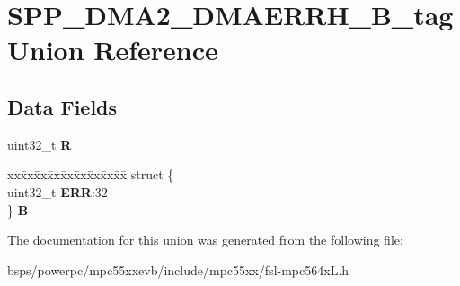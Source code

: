 \hypertarget{unionSPP__DMA2__DMAERRH__32B__tag}{}\section{S\+P\+P\+\_\+\+D\+M\+A2\+\_\+\+D\+M\+A\+E\+R\+R\+H\+\_\+B\+\_\+tag Union Reference}
\label{unionSPP__DMA2__DMAERRH__32B__tag}
\subsection*{Data Fields}
\begin{DoxyCompactItemize}
\item 
\mbox{\label{unionSPP__DMA2__DMAERRH__32B__tag_a173883d2d77becd05c436f6540c30718}} 
uint32\+\_\+t {\bfseries R}
\item 
\mbox{\label{unionSPP__DMA2__DMAERRH__32B__tag_a9c7700b3ac05977cf199fc7e55a6e87f}} 
\begin{tabbing}
xx\=xx\=xx\=xx\=xx\=xx\=xx\=xx\=xx\=\kill
struct \{\\
\>uint32\_t {\bfseries ERR}:32\\
\} {\bfseries B}\\

\end{tabbing}\end{DoxyCompactItemize}


The documentation for this union was generated from the following file\+:\begin{DoxyCompactItemize}
\item 
bsps/powerpc/mpc55xxevb/include/mpc55xx/fsl-\/mpc564x\+L.\+h\end{DoxyCompactItemize}
